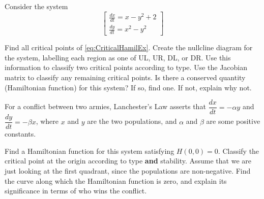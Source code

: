 \documentclass{ximera}
\begin{document}
\begin{exercise}
    Consider the system
    \begin{equation}
        \begin{bmatrix}
            \frac{dx}{dt}=x-y^2+2\\[12pt]
            \frac{dy}{dt}=x^2-y^2
        \end{bmatrix}
        \label{eq:CriticalHamilEx}
    \end{equation}
    \begin{tasks}
        \task Find all critical points of \eqref{eq:CriticalHamilEx}.
        \task Create the nullcline diagram for the system, labelling each region as one of UL, UR, DL, or DR. Use this information to classify two critical points according to type.
        \task Use the Jacobian matrix to classify any remaining critical points.
        \task Is there a conserved quantity (Hamiltonian function) for this system? If so, find one. If not, explain why not.
    \end{tasks}
\end{exercise}
%

\begin{exercise}
    For a conflict between two armies, Lanchester's Law asserts that $\dfrac{dx}{dt}=-\alpha y$ and $\dfrac{dy}{dt}=-\beta x$, %
    where $x$ and $y$ are the two populations, and $\alpha$ and $\beta$ are some positive constants.
    
    \begin{tasks}
        \task Find a Hamiltonian function for this system satisfying $H(0,0)=0$. 
        \task Classify the critical point at the origin according to type {\bf and} stability.
        \task Assume that we are just looking at the first quadrant, since the populations are non-negative. Find the curve along which the Hamiltonian function is zero, and explain its significance in terms of who wins the conflict.
    \end{tasks}
\end{exercise}
\end{document}
